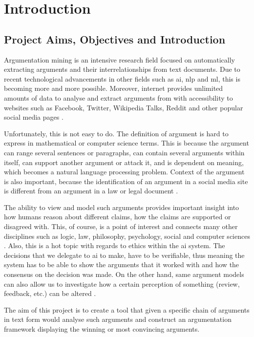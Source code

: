 \section{Introduction}
\subsection{Project Aims, Objectives and Introduction} 
 Argumentation mining is an intensive research field focused on automatically extracting arguments and their interrelationships from text documents. Due to recent technological advancements in other fields such as \gls{ai}, \gls{nlp} and \gls{ml}, this is becoming more and more possible. Moreover, internet provides unlimited amounts of data to analyse and extract arguments from with accessibility to websites such as Facebook, Twitter, Wikipedia Talks, Reddit and other popular social media pages \citep{Lippi2016ArgumentationMS}. 
 
 Unfortunately, this is not easy to do. The definition of argument is hard to express in mathematical or computer science terms. This is because the argument can range several sentences or paragraphs, can contain several arguments within itself, can support another argument or attack it, and is dependent on meaning, which becomes a natural language processing problem. Context of the argument is also important, because the identification of an argument in a social media site is different from an argument in a law or legal document \citep{Cocarascu2017MiningBA}.

 The ability to view and model such arguments provides important insight into how humans reason about different claims, how the claims are supported or disagreed with. This, of course, is a point of interest and connects many other disciplines such as logic, law, philosophy, psychology, social and computer sciences \citep{Lippi2016ArgumentationMS}. Also, this is a hot topic with regards to ethics within the \gls{ai} system. The decisions that we delegate to \gls{ai} to make, have to be verifiable, thus meaning the system has to be able to show the arguments that it worked with and how the consensus on the decision was made. On the other hand, same argument models can also allow us to investigate how a certain perception of something (review, feedback, etc.) can be altered \citep{ApproxToTruth}.
 
 The aim of this project is to create a tool that given a specific chain of arguments in text form would analyse such arguments and construct an argumentation framework displaying the winning or most convincing arguments.
 

